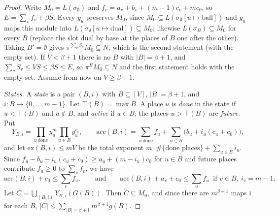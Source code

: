 \begin{proof}
Write $M_0=L(\sigma_\emptyset)$ and $f_v=a_v+b_v+(m-1)c_v+mc_0$, so $E=\sum_vf_v+\beta S$. Every $y_u$ preserves $M_0$, since
$M_0\subseteq L(\sigma_\emptyset[u\mapsto\mathrm{ball}])$ and $y_u$ maps this module into
$L(\sigma_\emptyset[u\mapsto\mathrm{dual}])\subseteq M_0$; likewise $L(\sigma_B)\subseteq M_0$ for every $B$ (replace the slot
$\mathrm{dual}$ by $\mathrm{base}$ at the places of $B$ one after the other). Taking $B'=\emptyset$ gives
$\pi^{\sum_vS_v}M_0\subseteq N$, which is the second statement (with the empty set). If $V<\beta+1$ there is no $B$ with
$|B|=\beta+1$, and $\sum_vS_v\le VS\le\beta S\le E$, so $\pi^EM_0\subseteq N$ and the first statement holds with the empty
set. Assume from now on $V\ge\beta+1$.

\emph{States.} A \emph{state} is a pair $(B,i)$ with $B\subseteq[V]$, $|B|=\beta+1$, and $i:B\to\{0,\dots,m-1\}$. Let
$\top(B)=\max B$. A place $u$ is \emph{done} in the state if $u<\top(B)$ and $u\notin B$, and \emph{active} if $u\in B$; the
places $u>\top(B)$ are \emph{future}. Put
\[
Y_{B,i}=\prod_{u\ \mathrm{done}}y_u^m\prod_{u\in B}y_u^{i_u},\qquad
\mathrm{acc}(B,i)=\sum_{u\ \mathrm{done}}f_u+\sum_{u\in B}\bigl(b_u+i_u(c_u+c_0)\bigr),
\]
and let $\mathrm{ex}(B,i)\le mV$ be the total exponent $m\cdot\#\{\text{done places}\}+\sum_{u\in B}i_u$. Since
$f_u-b_u-i_u(c_u+c_0)\ge a_u+(m-i_u)c_0$ for $u\in B$ and future places contribute $f_u\ge0$ to $\sum_vf_v$, we have
\begin{equation}\label{eq:pf:linkG:walkcost}
\mathrm{acc}(B,i)+c_0\le\sum_vf_v,\qquad\text{and}\qquad\mathrm{acc}(B,i)+a_v+c_0\le\sum_uf_u\ \text{ if }v\in B,\ i_v=m-1.
\end{equation}
Let $C=\bigcup_{(B,i)}Y_{B,i}(G(B))$. Then $C\subseteq M_0$, and since there are $m^{\beta+1}$ maps $i$ for each $B$,
$|C|\le\sum_{|B|=\beta+1}m^{\beta+1}g(B)$.


\end{proof}
